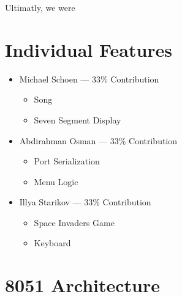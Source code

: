 \documentclass[12pt]{article}
\begin{document}
Ultimatly, we were


\section{Individual Features}
\begin{itemize}
    \item Michael Schoen --- 33\% Contribution
    \begin{itemize}
        \item Song
        \item Seven Segment Display
    \end{itemize}

    \item Abdirahman Osman --- 33\% Contribution
    \begin{itemize}
        \item Port Serialization
        \item Menu Logic
    \end{itemize}

    \item Illya Starikov --- 33\% Contribution
    \begin{itemize}
        \item Space Invaders Game
        \item Keyboard
    \end{itemize}
\end{itemize}

\section{8051 Architecture}
\end{document}

